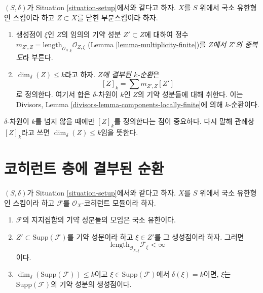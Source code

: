 \begin{definition}
\label{definition-cycle-associated-to-closed-subscheme}
$(S, \delta)$가 Situation \ref{situation-setup}에서와 같다고 하자.
$X$를 $S$ 위에서 국소 유한형인 스킴이라 하고 $Z \subset X$를 닫힌
부분스킴이라 하자.
\begin{enumerate}
\item 생성점이 $\xi$인 $Z$의 임의의 기약 성분 $Z' \subset Z$에 대하여
정수
$m_{Z', Z} = \text{length}_{\mathcal{O}_{X, \xi}} \mathcal{O}_{Z, \xi}$
(Lemma \ref{lemma-multiplicity-finite})를 {\it $Z$에서 $Z'$의 중복도}라
부른다.
\item $\dim_\delta(Z) \leq k$라고 하자. {\it $Z$에 결부된 $k$-순환}은
$$
[Z]_k
=
\sum m_{Z', Z}[Z']
$$
로 정의한다. 여기서 합은 $\delta$-차원이 $k$인 $Z$의 기약 성분들에
대해 취한다. 이는 Divisors, Lemma
\ref{divisors-lemma-components-locally-finite}에 의해 $k$-순환이다.
\end{enumerate}
\end{definition}

\noindent
$\delta$-차원이 $k$를 넘지 않을 때에만 $[Z]_k$를 정의한다는 점이
중요하다. 다시 말해 관례상 $[Z]_k$라고 쓰면
$\dim_\delta(Z) \leq k$임을 뜻한다.

\section{코히런트 층에 결부된 순환}
\label{section-cycle-of-coherent-sheaf}



\begin{lemma}
\label{lemma-length-finite}
$(S, \delta)$가 Situation \ref{situation-setup}에서와 같다고 하자.
$X$를 $S$ 위에서 국소 유한형인 스킴이라 하고
$\mathcal{F}$를 $\mathcal{O}_X$-코히런트 모듈이라 하자.
\begin{enumerate}
\item $\mathcal{F}$의 지지집합의 기약 성분들의 모임은 국소 유한이다.
\item $Z' \subset \text{Supp}(\mathcal{F})$를 기약 성분이라 하고
$\xi \in Z'$를 그 생성점이라 하자. 그러면
$$
\text{length}_{\mathcal{O}_{X, \xi}} \mathcal{F}_\xi < \infty
$$
이다.
\item $\dim_\delta(\text{Supp}(\mathcal{F})) \leq k$이고
$\xi \in \text{Supp}(\mathcal{F})$에서 $\delta(\xi) = k$이면, $\xi$는
$\text{Supp}(\mathcal{F})$의 기약 성분의 생성점이다.
\end{enumerate}
\end{lemma}

